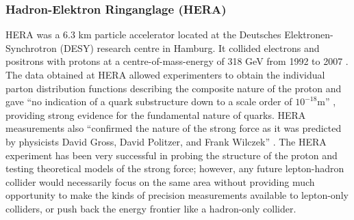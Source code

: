 \subsubsection{Hadron-Elektron Ringanglage (HERA)}
HERA was a 6.3 km particle accelerator located at the Deutsches Elektronen-Synchrotron (DESY) research centre in Hamburg. It collided electrons and positrons with protons at a centre-of-mass-energy of 318 GeV from 1992 to 2007 \cite{PHYS:HERA}. The data obtained at HERA allowed experimenters to obtain the individual parton distribution functions describing the composite nature of the proton and gave ``no indication of a quark substructure down to a scale order of $10^{-18}$m'' \cite{SPS:HERA}, providing strong evidence for the fundamental nature of quarks. HERA measurements also ``confirmed the nature of the strong force as it was predicted by physicists David Gross, David Politzer, and Frank Wilczek'' \cite{PHYS:HERA}. The HERA experiment has been very successful in probing the structure of the proton and testing theoretical models of the strong force; however, any future lepton-hadron collider would necessarily focus on the same area without providing much opportunity to make the kinds of precision measurements available to lepton-only colliders, or push back the energy frontier like a hadron-only collider.
